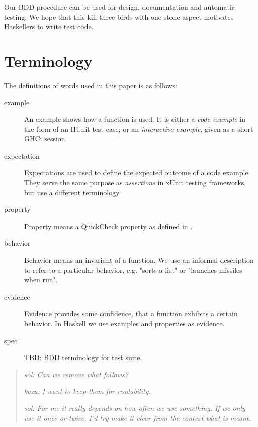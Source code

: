 \documentclass[preprint]{sigplanconf}
\begin{document}
\noindent Our BDD procedure
can be used for design, documentation and automatic testing.
We hope that this kill-three-birds-with-one-stone aspect
motivates Haskellers to write test code.

\section{Terminology}

The definitions of words used in this paper is as follows:

\begin{description}

\item[example]
    An example shows how a function is used.  It is either a \emph{code
    example} in the form of an HUnit test case; or an \emph{interactive
    example}, given as a short GHCi session.

\item[expectation]
    Expectations are used to define the expected outcome of a code
    example.  They serve the same purpose as \emph{assertions} in xUnit
    testing frameworks, but use a different terminology.

\item[property]
    Property means a QuickCheck property as defined in
    \cite{quickcheck}.

\item[behavior]
    Behavior means an invariant of a function.  We use an informal description
    to refer to a particular behavior, e.g.  "sorts a list" or "launches
    missiles when run".

\item[evidence]
    Evidence provides some confidence, that a function exhibits a
    certain behavior.  In Haskell we use examples and properties as
    evidence.

\item[spec]
    TBD: BDD terminology for test suite.
\end{description}


\begin{quote}
    \emph{sol: Can we remove what follows?}

    \emph{kazu: I want to keep them for readability.}

    \emph{sol: For me it really depends on how often we use something.
    If we only use it once or twice, I'd try make it clear from the
    context what is meant.}
\end{quote}
\end{document}
